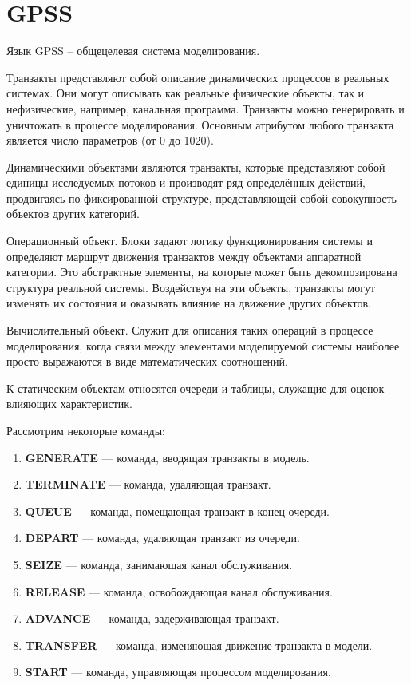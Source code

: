 \section{GPSS}

Язык GPSS – общецелевая система моделирования.

Транзакты представляют собой описание динамических процессов в
реальных системах. Они могут описывать как реальные физические объекты,
так и нефизические, например, канальная программа. Транзакты можно
генерировать и уничтожать в процессе моделирования. Основным атрибутом
любого транзакта является число параметров (от 0 до 1020).

Динамическими объектами являются транзакты, которые представляют собой единицы исследуемых потоков и производят ряд определённых
действий, продвигаясь по фиксированной структуре, представляющей собой
совокупность объектов других категорий.

Операционный объект. Блоки задают логику функционирования
системы и определяют маршрут движения транзактов между объектами
аппаратной категории. Это абстрактные элементы, на которые может быть
декомпозирована структура реальной системы. Воздействуя на эти объекты,
транзакты могут изменять их состояния и оказывать влияние на движение
других объектов.

Вычислительный объект. Служит для описания таких операций
в процессе моделирования, когда связи между элементами моделируемой
системы наиболее просто выражаются в виде математических соотношений.

К статическим объектам относятся очереди и таблицы, служащие
для оценок влияющих характеристик.

Рассмотрим некоторые команды:
\begin{enumerate}
	\item \textbf{GENERATE} --- команда, вводящая транзакты в модель.
	\item \textbf{TERMINATE} ---  команда, удаляющая транзакт.
	\item \textbf{QUEUE} --- команда, помещающая транзакт в конец очереди.
	\item \textbf{DEPART} --- команда, удаляющая транзакт из очереди.
	\item \textbf{SEIZE} --- команда, занимающая канал обслуживания.
	\item \textbf{RELEASE} --- команда, освобождающая канал обслуживания.
	\item \textbf{ADVANCE} ---  команда, задерживающая транзакт.
	\item \textbf{TRANSFER} --- команда, изменяющая движение транзакта в модели.
	\item \textbf{START} --- команда, управляющая процессом моделирования.
\end{enumerate}